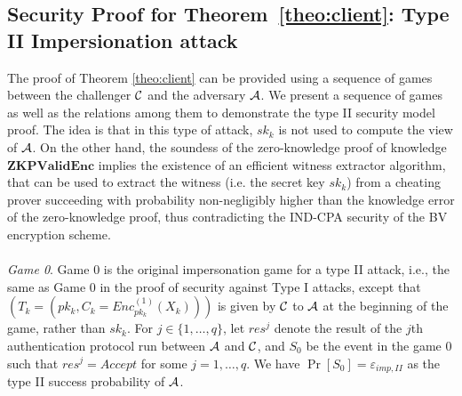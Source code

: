 \subsection{Security Proof for Theorem~\ref{theo:client}: Type II Impersionation attack}
\label{append:ProofsTypeII}
The proof of Theorem \ref{theo:client} can be provided using a sequence of games between the challenger $\mathcal{C}$ and the adversary $\mathcal{A}$. We present
a sequence of games as well as the relations among them to demonstrate the type II security model proof. The idea is that in this type of attack, $sk_k$ is not used to compute the view of $\mathcal{A}$. On the other hand, the soundess of the zero-knowledge proof of knowledge $\mathbf{ZKPValidEnc}$ implies the existence of an efficient witness extractor algorithm, that can be used to extract the witness (i.e. the secret key $sk_k$) from a cheating prover succeeding with probability non-negligibly higher than the knowledge error of the zero-knowledge proof, thus contradicting the IND-CPA security of the BV encryption scheme. \\\\
\textit{Game 0}. Game 0 is the original impersonation game for a type II attack, i.e., the same as Game 0 in the proof of security against Type I attacks, except that $(T_k =(pk_k, C_k = Enc^{(1)}_{pk_k}(X_k)))$ is given by $\mathcal{C}$ to $\mathcal{A}$ at the beginning of the game, rather than $sk_k$.
For $j \in \{1,\ldots,q\}$, let $res^{j}$ denote the result of the $j$th authentication protocol run between $\mathcal{A}$ and $\mathcal{C}$, and $S_0$ be
the event in the game $0$ such that $res^{j} = Accept$ for some $j=1,\ldots,q$. We have $\Pr[S_0] = \varepsilon_{imp,II}$ as the type II success probability of $\mathcal{A}$. \\\\
